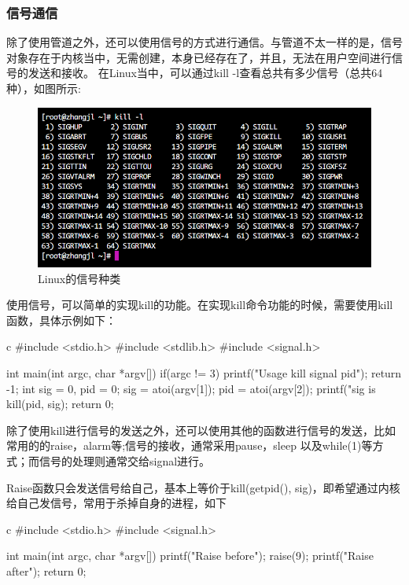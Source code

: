 \subsubsection{信号通信}
除了使用管道之外，还可以使用信号的方式进行通信。与管道不太一样的是，信号对象存在于内核当中，无需创建，本身已经存在了，并且，无法在用户空间进行信号的发送和接收。
在Linux当中，可以通过kill -l查看总共有多少信号（总共64种），如图所示:
\begin{figure}[H]
  \centering
  \includegraphics[scale=0.4]{signal.png}
  \caption{Linux的信号种类}
  \label{fig:signal}
\end{figure}

使用信号，可以简单的实现kill的功能。在实现kill命令功能的时候，需要使用kill函数，具体示例如下：
\begin{code-block}{c}
#include <stdio.h>
#include <stdlib.h>
#include <signal.h>

int main(int argc, char *argv[])
{
        if(argc != 3)
        {
                printf("Usage kill signal pid\n");
                return -1;
        }
        int sig = 0, pid = 0;
        sig = atoi(argv[1]);
        pid = atoi(argv[2]);
        printf("sig is %
        kill(pid, sig);
        return 0;
}
\end{code-block}

除了使用kill进行信号的发送之外，还可以使用其他的函数进行信号的发送，比如常用的的raise，alarm等;信号的接收，通常采用pause，sleep
以及while(1)等方式；而信号的处理则通常交给signal进行。

Raise函数只会发送信号给自己，基本上等价于kill(getpid(), sig)，即希望通过内核给自己发信号，常用于杀掉自身的进程，如下
\begin{code-block}{c}
#include <stdio.h>
#include <signal.h>

int main(int argc, char *argv[])
{
        printf("Raise before\n");
        raise(9);
        printf("Raise after\n");
        return 0;
}
\end{code-block}

